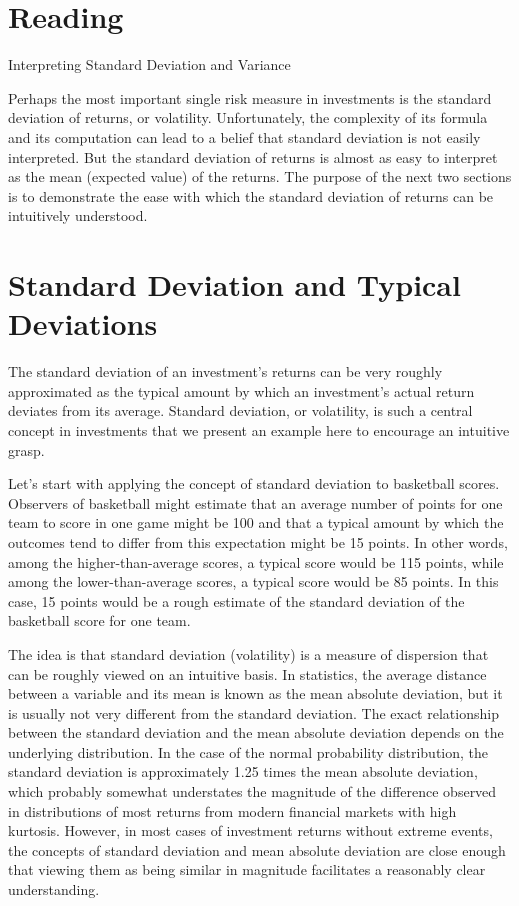 \documentclass[11pt]{article}
\begin{document}
\section*{Reading}
Interpreting Standard Deviation and Variance

Perhaps the most important single risk measure in investments is the standard deviation of returns, or volatility. Unfortunately, the complexity of its formula and its computation can lead to a belief that standard deviation is not easily interpreted. But the standard deviation of returns is almost as easy to interpret as the mean (expected value) of the returns. The purpose of the next two sections is to demonstrate the ease with which the standard deviation of returns can be intuitively understood.

\section*{Standard Deviation and Typical Deviations}
The standard deviation of an investment's returns can be very roughly approximated as the typical amount by which an investment's actual return deviates from its average. Standard deviation, or volatility, is such a central concept in investments that we present an example here to encourage an intuitive grasp.

Let's start with applying the concept of standard deviation to basketball scores. Observers of basketball might estimate that an average number of points for one team to score in one game might be 100 and that a typical amount by which the outcomes tend to differ from this expectation might be 15 points. In other words, among the higher-than-average scores, a typical score would be 115 points, while among the lower-than-average scores, a typical score would be 85 points. In this case, 15 points would be a rough estimate of the standard deviation of the basketball score for one team.

The idea is that standard deviation (volatility) is a measure of dispersion that can be roughly viewed on an intuitive basis. In statistics, the average distance between a variable and its mean is known as the mean absolute deviation, but it is usually not very different from the standard deviation. The exact relationship between the standard deviation and the mean absolute deviation depends on the underlying distribution. In the case of the normal probability distribution, the standard deviation is approximately 1.25 times the mean absolute deviation, which probably somewhat understates the magnitude of the difference observed in distributions of most returns from modern financial markets with high kurtosis. However, in most cases of investment returns without extreme events, the concepts of standard deviation and mean absolute deviation are close enough that viewing them as being similar in magnitude facilitates a reasonably clear understanding.
\end{document}
